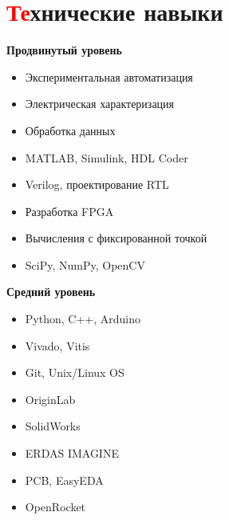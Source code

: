 \documentclass[a4paper, 10pt]{article} %
\begin{document}
\section{\textcolor{red}{Те}хнические навыки}
\begin{center}
    \begin{minipage}[t]{0.45\textwidth}
        \textbf{Продвинутый уровень}
        \vspace{-7pt}
        \begin{itemize}
            \setlength{\itemindent}{0em}
            \setlength{\itemsep}{-3pt}
            \item Экспериментальная автоматизация
            \item Электрическая характеризация
            \item Обработка данных
            \item MATLAB, Simulink, HDL Coder
            \item Verilog, проектирование RTL
            \item Разработка FPGA
            \item Вычисления с фиксированной точкой
            \item SciPy, NumPy, OpenCV
        \end{itemize}
    \end{minipage}%
    \hfill
    \begin{minipage}[t]{0.45\textwidth}
        \textbf{Средний уровень}
        \vspace{-7pt}
        \begin{itemize}
            \setlength{\itemindent}{0em}
            \setlength{\itemsep}{-3pt}
            \item Python, C++, Arduino
            \item Vivado, Vitis
            \item Git, Unix/Linux OS
            \item OriginLab
            \item SolidWorks
            \item ERDAS IMAGINE
            \item PCB, EasyEDA
            \item OpenRocket
        \end{itemize}
    \end{minipage}
\end{center}
\vspace{-18pt} %

\end{document}
